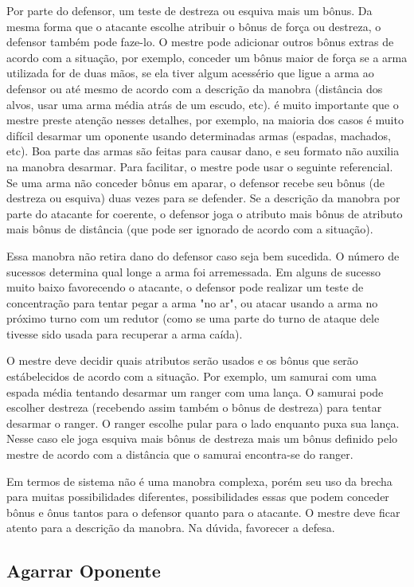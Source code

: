 Por parte do defensor, um teste de destreza ou esquiva mais um bônus. Da mesma forma que o atacante escolhe atribuir o bônus de força ou destreza, o defensor também pode faze-lo. O mestre pode adicionar outros bônus extras de acordo com a situação, por exemplo, conceder um bônus maior de força se a arma utilizada for de duas mãos, se ela tiver algum acessério que ligue a arma ao defensor ou até mesmo de acordo com a descrição da manobra (distância dos alvos, usar uma arma média atrás de um escudo, etc). é muito importante que o mestre preste atenção nesses detalhes, por exemplo, na maioria dos casos é muito difícil desarmar um oponente usando determinadas armas (espadas, machados, etc). Boa parte das armas são feitas para causar dano, e seu formato não auxilia na manobra desarmar. Para facilitar, o mestre pode usar o seguinte referencial. Se uma arma não conceder bônus em aparar, o defensor recebe seu bônus (de destreza ou esquiva) duas vezes para se defender. Se a descrição da manobra por parte do atacante for coerente, o defensor joga o atributo mais bônus de atributo mais bônus de distância (que pode ser ignorado de acordo com a situação).

Essa manobra não retira dano do defensor caso seja bem sucedida. O número de sucessos determina qual longe a arma foi arremessada. Em alguns de sucesso muito baixo favorecendo o atacante, o defensor pode realizar um teste de concentração para tentar pegar a arma "no ar", ou atacar usando a arma no próximo turno com um redutor (como se uma parte do turno de ataque dele tivesse sido usada para recuperar a arma caída).
 
O mestre deve decidir quais atributos serão usados e os bônus que serão estábelecidos de acordo com a situação. Por exemplo, um samurai com uma espada média tentando desarmar um ranger com uma lança. O samurai pode escolher destreza (recebendo assim também o bônus de destreza) para tentar desarmar o ranger. O ranger escolhe pular para o lado enquanto puxa sua lança. Nesse caso ele joga esquiva mais bônus de destreza mais um bônus definido pelo mestre de acordo com a distância que o samurai encontra-se do ranger.

Em termos de sistema não é uma manobra complexa, porém seu uso da brecha para muitas possibilidades diferentes, possibilidades essas que podem conceder bônus e ônus tantos para o defensor quanto para o atacante. O mestre deve ficar atento para a descrição da manobra. Na dúvida, favorecer a defesa.

\subsection{Agarrar Oponente}

